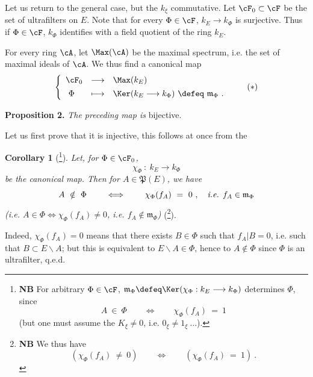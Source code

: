 \noindent Let us return to the general case, but the $k_\xi$ commutative. Let $\cF_0\subset\cF$ be the set of ultrafilters on $E$. Note that for every $\Phi\in\cF$, $k_E\longrightarrow k_\Phi$ is surjective. Thus if $\Phi\in\cF$, $k_\Phi$ identifies with a field quotient of the ring $k_E$.


\noindent For every ring $\cA$, let $\Max(\cA)$ be the maximal spectrum, i.e. the set of maximal ideals of $\cA$. We thus find a canonical map
\[
\left\{
\begin{array}{lll}
\cF_0 & \longrightarrow & \Max(k_E)\\[1ex]
\ \Phi & \longmapsto & \Ker(k_E\longrightarrow k_\Phi) \ \defeq \ \mathfrak{m}_\Phi \ .
\end{array}\right. \tag*{$(*)$}
\]

\noindent\textbf{Proposition 2.} \textit{The preceding map is} bijective.

\noindent Let us first prove that it is injective, this follows at once from the

\noindent\textbf{Corollary 1} (\footnote[204]{\textbf{NB} For arbitrary $\Phi\in\cF$, $\mathfrak{m}_\Phi\defeq\Ker(\chi_\Phi : k_E\longrightarrow k_\Phi)$ determines $\Phi$, since
\[
A \ \in \ \Phi \qquad\iff\qquad \chi_\Phi(f_A) \ = \ 1
\]
(but one must assume the $K_\xi\neq0$, i.e. $0_\xi\neq1_\xi\ \ldots$).}). \textit{Let, for $\Phi\in\cF_0$,}
\[
\chi_\Phi \ : \ k_E \longrightarrow k_\Phi
\]
\textit{be the canonical map. Then for $A\in\mathfrak{P}(E)$, we have}
\[
A \ \notin \ \Phi \qquad\iff\qquad \chi_\Phi(f_A) \ = \ 0 \ , \quad \text{\textit{i.e.} } f_A\in\mathfrak{m}_\Phi
\]
\textit{(i.e. $A\in\Phi\iff\chi_\Phi(f_A)\neq0$, i.e. $f_A\notin\mathfrak{m}_\Phi$)} (\footnote[205]{\textbf{NB} We thus have
\[
(\chi_\Phi(f_A) \ \neq \ 0) \qquad\iff\qquad (\chi_\Phi(f_A) \ = \ 1) \ .
\]}).

\noindent Indeed, $\chi_\Phi(f_A)=0$ means that there exists $B\in\Phi$ such that $f_A|B=0$, i.e. such that $B\subset E\backslash A$; but this is equivalent to $E\backslash A\in\Phi$, hence to $A\notin\Phi$ since $\Phi$ is an ultrafilter, q.e.d.

